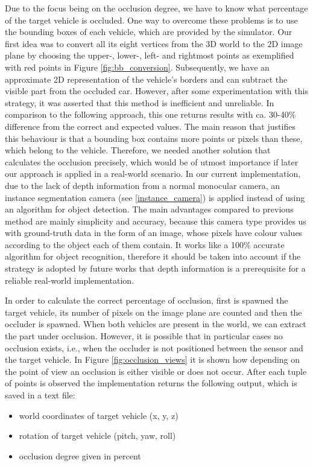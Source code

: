 Due to the focus being on the occlusion degree, we have to know what percentage of the target vehicle is occluded. One way to overcome these problems is to use the bounding boxes of each vehicle, which are provided by the simulator. Our first idea was to convert all its eight vertices from the 3D world to the 2D image plane by choosing the upper-, lower-,  left- and rightmost points as exemplified with red points in Figure \ref{fig:bb_conversion}. Subsequently, we have an approximate 2D representation of the vehicle's borders and can subtract the visible part from the occluded car. However, after some experimentation with this strategy, it was asserted that this method is inefficient and unreliable. In comparison to the following approach, this one returns results with ca. 30-40\% difference from the correct and expected values. The main reason that justifies this behaviour is that a bounding box contains more points or pixels than these, which belong to the vehicle. Therefore, we needed another solution that calculates the occlusion precisely, which would be of utmost importance if later our approach is applied in a real-world scenario.
In our current implementation, due to the lack of depth information from a normal monocular camera, an instance segmentation camera (see \ref{instance_camera}) is applied instead of using an algorithm for object detection. The main advantages compared to previous method are mainly simplicity and accuracy, because this camera type provides us with ground-truth data in the form of an image, whose pixels have colour values according to the object each of them contain. It works like a 100\% accurate algorithm for object recognition, therefore it should be taken into account if the strategy is adopted by future works that depth information is a prerequisite for a reliable real-world implementation.

In order to calculate the correct percentage of occlusion, first is spawned the target vehicle, its number of pixels on the image plane are counted  and then the occluder is spawned. When both vehicles are present in the world, we can extract the part under occlusion. However, it is possible that in particular cases no occlusion exists, i.e., when the occluder is not positioned between the sensor and the target vehicle. In Figure \ref{fig:occlusion_views} it is shown how depending on the point of view an occlusion is either visible or does not occur. After each tuple of points is observed the implementation returns the following output, which is saved in a text file:
\begin{itemize}
    \item world coordinates of target vehicle (x, y, z)
    \item rotation of target vehicle (pitch, yaw, roll)
    \item occlusion degree given in percent
\end{itemize}

